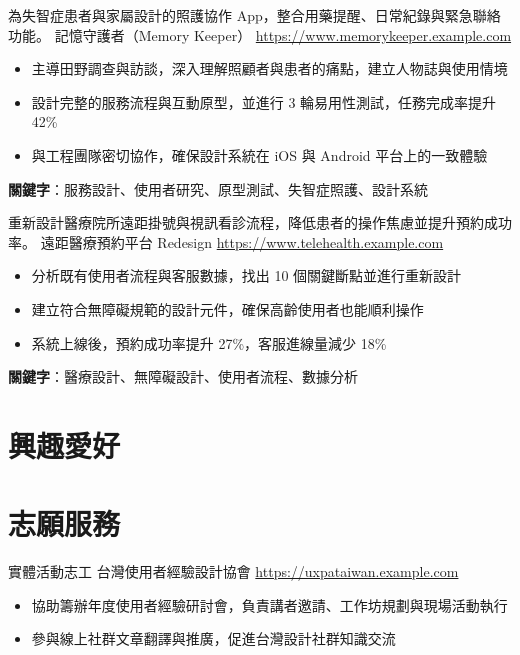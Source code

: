 \documentclass[a4paper, serif, 10pt]{moderncv}
\begin{document}
        {為失智症患者與家屬設計的照護協作 App，整合用藥提醒、日常紀錄與緊急聯絡功能。}
        {記憶守護者（Memory Keeper）}
        {\url{https://www.memorykeeper.example.com}}
        {}
        {\begin{itemize}
\item 主導田野調查與訪談，深入理解照顧者與患者的痛點，建立人物誌與使用情境
\item 設計完整的服務流程與互動原型，並進行 3 輪易用性測試，任務完成率提升 42\%
\item 與工程團隊密切協作，確保設計系統在 iOS 與 Android 平台上的一致體驗
\end{itemize}
\textbf{關鍵字}：服務設計、使用者研究、原型測試、失智症照護、設計系統}

        {重新設計醫療院所遠距掛號與視訊看診流程，降低患者的操作焦慮並提升預約成功率。}
        {遠距醫療預約平台 Redesign}
        {\url{https://www.telehealth.example.com}}
        {}
        {\begin{itemize}
\item 分析既有使用者流程與客服數據，找出 10 個關鍵斷點並進行重新設計
\item 建立符合無障礙規範的設計元件，確保高齡使用者也能順利操作
\item 系統上線後，預約成功率提升 27\%，客服進線量減少 18\%
\end{itemize}
\textbf{關鍵字}：醫療設計、無障礙設計、使用者流程、數據分析}
\section{興趣愛好}

\section{志願服務}

        {實體活動志工}
        {台灣使用者經驗設計協會}
        {\url{https://uxpataiwan.example.com}}
        {}
        {\begin{itemize}
\item 協助籌辦年度使用者經驗研討會，負責講者邀請、工作坊規劃與現場活動執行
\item 參與線上社群文章翻譯與推廣，促進台灣設計社群知識交流
\end{itemize}}
    
\end{document}
